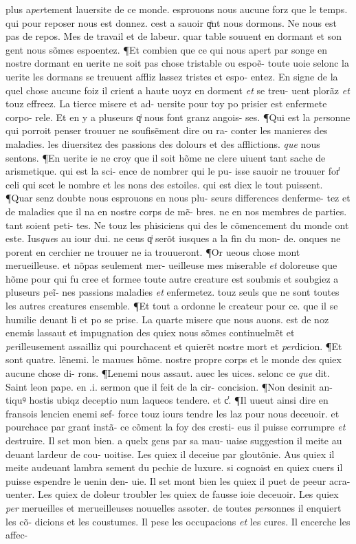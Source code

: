 \documentclass{article}
\begin{document}
\begin{pages}
plus a\textit{per}tement lauersite de ce monde. esprouons nous aucune forz que le temps. qui pour reposer nous est donnez. cest a sauoir qͣnt nous dormons. Ne nous est pas de repos. Mes de travail et de labeur. quar table souuent en dormant et son gent nous sõmes espoentez. ¶Et combien que ce qui nous apert par songe en nostre dormant en uerite ne soit pas chose tristable ou espoẽ- toute uoie selonc la uerite les dormans se treuuent affliz lassez tristes et espo- entez. En signe de la quel chose aucune foiz il crient a haute uoyz en dorment \textit{et} se treu- uent plorãz \textit{et} touz effreez. La tierce misere et ad- uersite pour toy po prisier est enfermete corpo- rele. Et en y a pluseurs qͥ nous font granz angois- ses. ¶Qui est la \textit{per}sonne qui porroit penser trouuer ne soufisẽment dire ou ra- conter les manieres des maladies. les diuersitez des passions des dolours et des afflictions. \textit{que} nous sentons. ¶En uerite ie ne croy que il soit hõme ne clere uiuent tant sache de arismetique. qui est la sci- ence de nombrer qui le pu- isse sauoir ne trouuer for̾ celi qui scet le nombre et les nons des estoiles. qui est diex le tout puissent. ¶Quar senz doubte nous esprouons en nous plu- seurs differences denferme- tez et de maladies que il na en nostre corps de mẽ- bres. ne en nos membres de parties. tant soient peti- tes. Ne touz les phisiciens qui des le cõmencement du monde ont este. Ius\textit{que}s au iour dui. ne ceus qͥ serõt iusques a la fin du mon- de. onques ne porent en cerchier ne trouuer ne ia trouueront. ¶Or ueous chose mont merueilleuse. et nõpas seulement mer- ueilleuse mes miserable \textit{et} doloreuse que hõme pour qui fu cree et formee toute autre creature est soubmis et soubgiez a pluseurs peĩ- nes passions maladies \textit{et} enfermetez. touz seuls que ne sont toutes les autres creatures ensemble. ¶Et tout a ordonne le createur pour ce. que il se humilie deuant li et po se prise. La quarte misere que nous auons. est de noz enemis lassaut et impugnation des quiex nous sõmes continuelmẽt et \textit{per}illeusement assailliz qui pourchacent et quierẽt nostre mort et \textit{per}dicion. ¶Et sont quatre. lẽnemi. le mauues hõme. nostre propre corps et le monde des quiex aucune chose di- rons. ¶Lenemi nous assaut. auec les uices. selonc ce \textit{que} dit. Saint leon pape. en .i. sermon que il feit de la cir- concision. ¶Non desinit an- tiquꝰ hostis ubiqz deceptio num laqueos tendere. et c̾. ¶Il uueut ainsi dire en fransois lencien enemi sef- force touz iours tendre les laz pour nous deceuoir. et pourchace par grant instã- ce cõment la foy des cresti- eus il puisse corrumpre \textit{et} destruire. Il set mon bien. a quelx gens par sa mau- uaise suggestion il meite au deuant lardeur de cou- uoitise. Les quiex il deceiue par gloutõnie. Aus quiex il meite audeuant lambra sement du pechie de luxure. si cognoist en quiex cuers il puisse espendre le uenin den- uie. Il set mont bien les quiex il puet de peeur acra- uenter. Les quiex de doleur troubler les quiex de fausse ioie deceuoir. Les quiex \textit{per} merueilles et merueilleuses nouuelles assoter. de toutes \textit{per}sonnes il enquiert les cõ- dicions et les coustumes. Il pese les occupacions \textit{et} les cures. Il encerche les affec- 
\end{pages}
\end{document}
